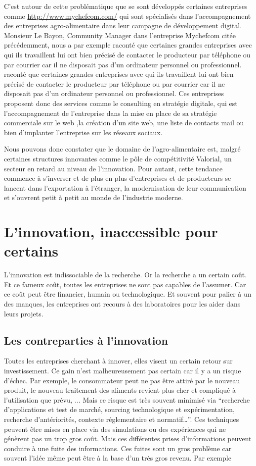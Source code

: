 \documentclass[a4paper,12pt]{report}
\begin{document}
			C’est autour de cette problématique que se sont développés certaines entreprises comme \url{http://www.mychefcom.com/} qui sont spécialisés dans l’accompagnement des entreprises agro-alimentaire dans leur campagne de développement digital. Monsieur Le Bayon, Community Manager dans l’entreprise Mychefcom citée précédemment, nous a par exemple raconté que certaines grandes entreprises avec qui ils travaillent lui ont bien précisé de contacter le producteur par téléphone ou par courrier car il ne disposait pas d’un ordinateur personnel ou professionnel. raconté que certaines grandes entreprises avec qui ils travaillent lui ont bien précisé de contacter le producteur par téléphone ou par courrier car il ne disposait pas d’un ordinateur personnel ou professionnel. Ces entreprises proposent donc des services comme le consulting en stratégie digitale, qui est l’accompagnement de l’entreprise dans la mise en place de sa stratégie commerciale sur le web ,la création d’un site web, une liste de contacts mail ou bien d’implanter l’entreprise sur les réseaux sociaux.
			
			Nous pouvons donc constater que le domaine de l’agro-alimentaire est, malgré certaines structures innovantes comme le pôle de compétitivité Valorial, un secteur en retard au niveau de l’innovation. Pour autant, cette tendance commence à s’inverser et de plus en plus d’entreprises et de producteurs se lancent dans l’exportation à l’étranger, la modernisation de leur communication et s’ouvrent petit à petit au monde de l’industrie moderne.
			
	\section{L'innovation, inaccessible pour certains}
		L’innovation est indissociable de la recherche. Or la recherche a un certain coût. Et ce fameux coût, toutes les entreprises ne sont pas capables de l’assumer. Car ce coût peut être financier, humain ou technologique. Et souvent pour palier à un des manques, les entreprises ont recours à des laboratoires pour les aider dans leurs projets.
		
		\subsection{Les contreparties à l'innovation}
		
		Toutes les entreprises cherchant à innover, elles visent un certain retour sur investissement. Ce gain n’est malheureusement pas certain car il y a un risque d'échec. Par exemple, le consommateur peut ne pas être attiré par le nouveau produit, le nouveau traitement des aliments revient plus cher et compliqué à l’utilisation que prévu, ... Mais ce risque est très souvent minimisé via “recherche d’applications et test de marché, sourcing technologique et expérimentation, recherche d’antériorités, contexte réglementaire et  normatif…”. Ces techniques peuvent être mises en place via des simulations ou des expériences qui ne génèrent pas un trop gros coût.
		Mais ces différentes prises d’informations peuvent conduire à une fuite des informations. Ces fuites sont un gros problème car souvent l’idée même peut être à la base d’un très gros revenu. Par exemple 
		
\end{document}
